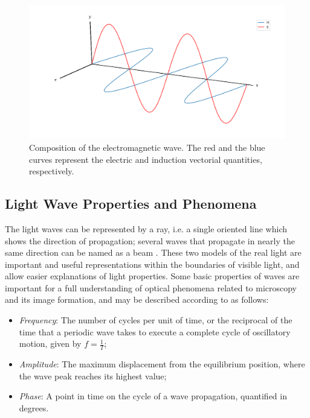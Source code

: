 \begin{figure}[htb]
	\centering
	\caption{\label{fig:electromagnetic_wave} 
		Composition of the electromagnetic wave. The red and the blue curves represent the electric and induction vectorial quantities, respectively.}
	\begin{center}
	    \includegraphics[scale=0.3]
			{images/fig2.png}
	\end{center}
	\centering
	\fautor
\end{figure}

\subsection{Light Wave Properties and Phenomena}

The light waves can be represented by a ray, i.e. a single oriented line which shows the direction of propagation; several waves that propagate in nearly the same direction can be named as a beam \cite{halliday2013fundamentals}. These two models of the real light are important and useful representations within the boundaries of visible light, and allow easier explanations of light properties. Some basic properties of waves are important for a full understanding of optical phenomena related to microscopy and its image formation, and may be described according to \cite{tipler2007physics} as follows:

\begin{itemize}
    \item \emph{Frequency}: The number of cycles per unit of time, or the reciprocal of the time that a periodic wave takes to execute a complete cycle of oscillatory motion, given by $f = \frac{1}{T}$;
    
    \item \emph{Amplitude}: The maximum displacement from the equilibrium position, where the wave peak reaches its highest value;
    
    \item \emph{Phase}: A point in time on the cycle of a wave propagation, quantified in degrees.
\end{itemize}

